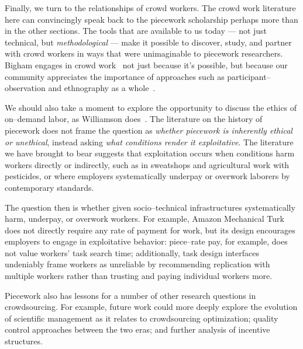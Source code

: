 \documentclass[pn4226]{subfiles}
\begin{document}
Finally, we turn to the relationships of crowd workers.
The crowd work literature here can convincingly speak back to
the piecework scholarship perhaps more than in the other sections.
The tools that are available to us today
--- not just technical, but \textit{methodological} ---
make it possible to
discover, study, and partner with 
crowd workers in ways that were unimaginable to piecework researchers.
Bigham engages in crowd work~\cite{bighamHalfWorkday}
not just because it's possible, but because our community
appreciates the importance of approaches such as participant--observation and ethnography as a whole~\cite{olson2014ways}.

We should also take a moment to explore the opportunity to discuss the ethics of on--demand labor,
as Williamson does~\cite{williamson2016}.
The literature on the history of piecework does not
frame the question as \textit{whether piecework is inherently ethical or unethical},
instead asking \textit{what conditions render it exploitative}.
The literature we have brought to bear suggests that exploitation occurs when
conditions harm workers directly or indirectly, such as
in sweatshops and agricultural work with pesticides, or where
employers systematically underpay or overwork laborers by contemporary standards.

The question then is
whether given socio--technical infrastructures 
systematically harm, underpay, or overwork workers.
For example, Amazon Mechanical Turk does not directly require any rate of payment for work,
but its design encourages employers to engage in exploitative behavior:
piece--rate pay, for example, does not value workers' task search time;
additionally, task design interfaces undeniably frame
workers as unreliable by recommending
replication with multiple workers rather than
trusting and paying individual workers more.


Piecework also has lessons for a number of other research questions in crowdsourcing.
For example, future work could more deeply explore the evolution of
scientific management as it relates to
crowdsourcing optimization;
quality control approaches between the two eras; and
further analysis of incentive structures.
\end{document}
